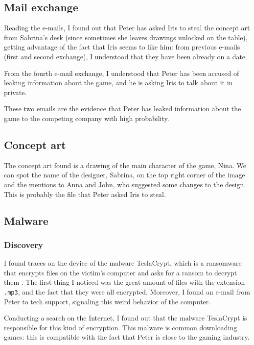 \documentclass[12pt]{article}
\begin{document}
\subsection{Mail exchange}
\label{sec:mail}

Reading the e-mails, I found out that Peter has asked Iris to steal the concept art from Sabrina's desk (since sometimes she leaves drawings unlocked on the table), getting advantage of the fact that Iris seems to like him: from previous e-mails (first and second exchange), I understood that they have been already on a date.

From the fourth e-mail exchange, I understood that Peter has been accused of leaking information about the game, and he is asking Iris to talk about it in private.

These two emails are the evidence that Peter has leaked information about the game to the competing company with high probability.

\subsection{Concept art}
\label{sec:art}

The concept art found is a drawing of the main character of the game, Nina. We can spot the name of the designer, Sabrina, on the top right corner of the image and the mentions to Anna and John, who suggested some changes to the design. This is probably the file that Peter asked Iris to steal.

\subsection{Malware}
\label{sec:malware}

\subsubsection{Discovery}
I found traces on the device of the malware TeslaCrypt, which is a ransomware that encrypts files on the victim's computer and asks for a ransom to decrypt them \cite{teslacrypt}.
The first thing I noticed was the great amount of files with the extension \texttt{.mp3}, and the fact that they were all encrypted.
Moreover, I found an e-mail from Peter to tech support, signaling this weird behavior of the computer.

Conducting a search on the Internet, I found out that the malware TeslaCrypt is responsible for this kind of encryption. This malware is common downloading games: this is compatible with the fact that Peter is close to the gaming industry.
\end{document}
